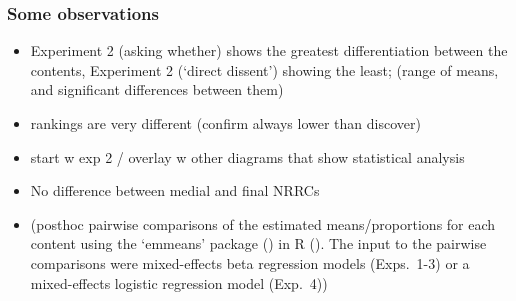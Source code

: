 \documentclass[compress, xcolor = dvipsnames, aspectratio=169]{beamer}
\begin{document}
	\begin{frame}[t]\frametitle{Some observations}\scriptsize
		\begin{itemize}
			\item Experiment 2 (asking whether) shows the greatest differentiation between the contents, Experiment 2 (`direct dissent') showing the least; (range of means, and significant differences between them)

			\item rankings are very different (confirm always lower than discover)
			\item start w exp 2 / overlay w other diagrams that show statistical analysis

			\item No difference between medial and final NRRCs

			\item  (posthoc pairwise comparisons of the estimated means/proportions for each content using the `emmeans' package (\citealt{emmeans}) in R (\citealt{r}). The input to the pairwise comparisons were mixed-effects beta regression models (Exps.~1-3) or a mixed-effects logistic regression model (Exp.~4))

		\end{itemize}
	
		
	
	\end{frame}
\end{document}
